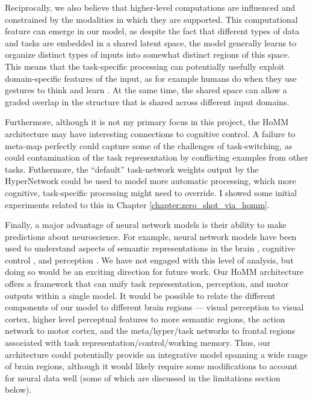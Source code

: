 Reciprocally, we also believe that higher-level computations are influenced and constrained by the modalities in which they are supported. This computational feature can emerge in our model, as despite the fact that different types of data and tasks are embedded in a shared latent space, the model generally learns to organize distinct types of inputs into somewhat distinct regions of this space. This means that the task-specific processing can potentially usefully exploit domain-specific features of the input, as for example humans do when they use gestures to think and learn \citep{Goldin-Meadow1999, Wakefield2018}. At the same time, the shared space can allow a graded overlap in the structure that is shared across different input domains. \par

Furthermore, although it is not my primary focus in this project, the HoMM architecture may have interesting connections to cognitive control. A failure to meta-map perfectly could capture some of the challenges of task-switching, as could contamination of the task representation by conflicting examples from other tasks. Futhermore, the ``default'' task-network weights output by the HyperNetwork could be used to model more automatic processing, which more cognitive, task-specific processing might need to override. I showed some initial experiments related to this in Chapter \ref{chapter:zero_shot_via_homm}. \par

Finally, a major advantage of neural network models is their ability to make predictions about neuroscience. For example, neural network models have been used to understand aspects of semantic representations in the brain \citep{Rogers2004}, cognitive control \citep{Shenhav2013}, and perception \citep{Yamins2016a}. We have not engaged with this level of analysis, but doing so would be an exciting direction for future work. Our HoMM architecture offers a framework that can unify task representation, perception, and motor outputs within a single model. It would be possible to relate the different components of our model to different brain regions --- visual perception to visual cortex, higher level perceptual features to more semantic regions, the action network to motor cortex, and the meta/hyper/task networks to frontal regions associated with task representation/control/working memory. Thus, our architecture could potentially provide an integrative model spanning a wide range of brain regions, although it would likely require some modifications to account for neural data well (some of which are discussed in the limitations section below). \par 

